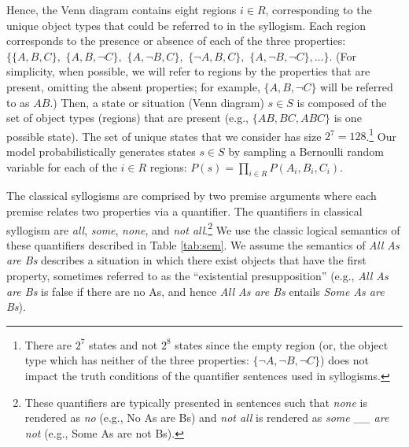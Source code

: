 \documentclass[floatsintext, doc]{apa6}
\newcommand{\mht}[1]{{\textcolor{Blue}{[mht: #1]}}}
\begin{document}
Hence, the Venn diagram contains eight regions $i \in R$, corresponding to the unique object types that could be referred to in the syllogism. 
Each region corresponds to the presence or absence of each of the three properties: $\{\{A,B,C\},$ $\{A,B,\neg C\},$ $\{A,\neg B,C\},$ $\{\neg A, B, C\},$ $\{A, \neg B, \neg C\},...\}$. (For simplicity, when possible, we will refer to regions by the properties that are present, omitting the absent properties; for example, $\{A, B, \neg C\}$ will be referred to as $AB$.)
Then, a state or situation (Venn diagram) $s \in S$ is composed of the set of object types (regions) that are present (e.g., $\{AB, BC, ABC\}$ is one possible state).
The set of unique states that we consider has size $2^7 = 128$.\footnote{
There are $2^7$ states and not $2^8$ states since the empty region (or, the object type which has neither of the three properties: $\{\neg A, \neg B, \neg C\}$) does not impact the truth conditions of the quantifier sentences used in syllogisms.
}
Our model probabilistically generates states $s \in S$ by sampling a Bernoulli random variable for each of the $i \in R$ regions: $P(s) = \prod_{i \in R} P(A_{i}, B_{i}, C_{i})$. %




The classical syllogisms are comprised by two premise arguments where each premise relates two properties via a quantifier. 
The quantifiers in classical syllogism are \emph{all}, \emph{some}, \emph{none}, and \emph{not all}.\footnote{
These quantifiers are typically presented in sentences such that \emph{none} is rendered as \emph{no} (e.g., No As are Bs) and \emph{not all} is rendered as \emph{some \_\_ are not} (e.g., Some As are not Bs).
}
We use the classic logical semantics of these quantifiers described in Table \ref{tab:sem}.
We assume the semantics of \emph{All As are Bs} describes a situation in which there exist objects that have the first property, sometimes referred to as the ``existential presupposition'' (e.g., \emph{All As are Bs} is false if there are no As, and hence \emph{All As are Bs} entails \emph{Some As are Bs}). 
\end{document}
